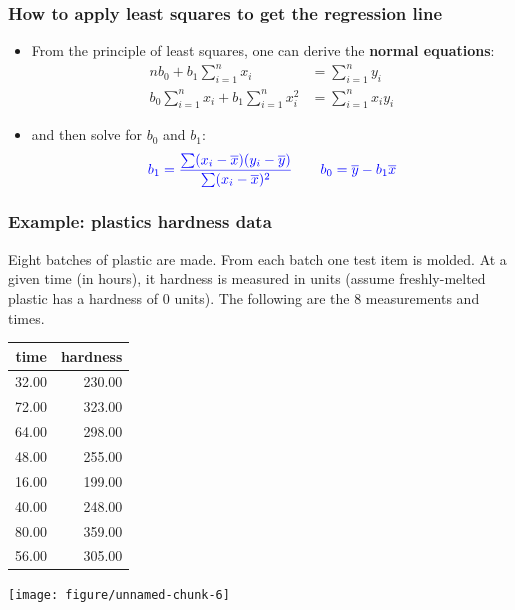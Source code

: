 \documentclass[handout]{beamer}\usepackage{graphicx, color}
\newenvironment{knitrout}{}{} %
\providecommand{\ov}[1]{\overline{#1}}
\numberwithin{equation}{section}
\begin{document}
\begin{frame}
\frametitle{How to apply least squares to get the regression line}
\begin{itemize}
\item From the principle of least squares, one can derive the {\bf normal equations}:
\pause \begin{align*}
n b_0 + b_1 \sum_{i = 1}^n x_i &= \sum_{i = 1}^n y_i \\
b_0 \sum_{i = 1}^n x_i + b_1 \sum_{i = 1}^n x_i^2 &= \sum_{i = 1}^n x_i y_i 
\end{align*}
\pause \item and then solve for $b_0$ and $b_1$:
\pause \begin{align*}
\color{blue} b_1 = \frac{\sum(x_i - \ov{x})(y_i - \ov{y})}{\sum(x_i - \ov{x})^2} \qquad b_0 = \ov{y}- b_1 \ov{x}
\end{align*}
\end{itemize}
\end{frame}

\begin{frame}[fragile]
\frametitle{Example: plastics hardness data} \small
Eight batches of plastic are made. From each batch one test item is molded. At a given time (in hours), it hardness is measured in units (assume freshly-melted plastic has a hardness of 0 units). The following are the 8 measurements and times.

\begin{minipage}[b]{0.47\linewidth} 
\begin{table}[ht]
\centering
\begin{tabular}{rr}
 time & hardness \\ 
  \hline
32.00 & 230.00 \\ 
  72.00 & 323.00 \\ 
  64.00 & 298.00 \\ 
  48.00 & 255.00 \\ 
  16.00 & 199.00 \\ 
  40.00 & 248.00 \\ 
  80.00 & 359.00 \\ 
  56.00 & 305.00 \\ 
  \end{tabular}
\end{table}


\end{minipage}
\begin{minipage}[b]{0.47\linewidth} 
\begin{knitrout}
\color{fgcolor}
\texttt{[image: figure/unnamed-chunk-6]} 

\end{knitrout}

\end{minipage}


\end{frame}
\end{document}
